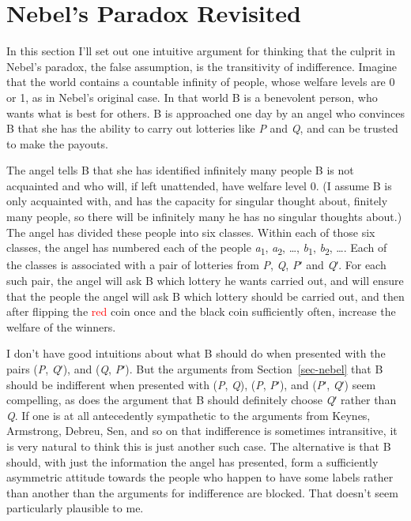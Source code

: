 \documentclass[
  11pt,
  letterpaper,
  DIV=11,
  numbers=noendperiod,
  twoside]{scrartcl}
\begin{document}
\section{Nebel's Paradox Revisited}\label{sec-nebel-revisited}

In this section I'll set out one intuitive argument for thinking that
the culprit in Nebel's paradox, the false assumption, is the
transitivity of indifference. Imagine that the world contains a
countable infinity of people, whose welfare levels are 0 or 1, as in
Nebel's original case. In that world B is a benevolent person, who wants
what is best for others. B is approached one day by an angel who
convinces B that she has the ability to carry out lotteries like
\emph{P} and \emph{Q}, and can be trusted to make the payouts.

The angel tells B that she has identified infinitely many people B is
not acquainted and who will, if left unattended, have welfare level 0.
(I assume B is only acquainted with, and has the capacity for singular
thought about, finitely many people, so there will be infinitely many he
has no singular thoughts about.) The angel has divided these people into
six classes. Within each of those six classes, the angel has numbered
each of the people \emph{a}\textsubscript{1}, \emph{a}\textsubscript{2},
\ldots, \emph{b}\textsubscript{1}, \emph{b}\textsubscript{2}, \ldots.
Each of the classes is associated with a pair of lotteries from
\emph{P}, \emph{Q}, \emph{P}ʹ and \emph{Q}ʹ. For each such pair, the
angel will ask B which lottery he wants carried out, and will ensure
that the people the angel will ask B which lottery should be carried
out, and then after flipping the \textcolor{red}{red} coin once and the
black coin sufficiently often, increase the welfare of the winners.

I don't have good intuitions about what B should do when presented with
the pairs (\emph{P}, \emph{Q}ʹ), and (\emph{Q}, \emph{P}ʹ). But the
arguments from Section~\ref{sec-nebel} that B should be indifferent when
presented with (\emph{P}, \emph{Q}), (\emph{P}, \emph{P}ʹ), and
(\emph{P}ʹ, \emph{Q}ʹ) seem compelling, as does the argument that B
should definitely choose \emph{Q}ʹ rather than \emph{Q}. If one is at
all antecedently sympathetic to the arguments from Keynes, Armstrong,
Debreu, Sen, and so on that indifference is sometimes intransitive, it
is very natural to think this is just another such case. The alternative
is that B should, with just the information the angel has presented,
form a sufficiently asymmetric attitude towards the people who happen to
have some labels rather than another than the arguments for indifference
are blocked. That doesn't seem particularly plausible to me.
\end{document}
